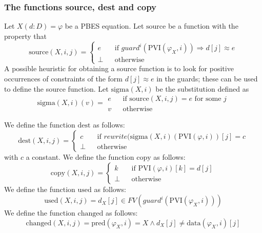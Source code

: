 \subsubsection{The functions source, dest and copy}

Let $X(d:D)=\varphi $ be a PBES equation. Let $\mathrm{source}$ be a
function with the property that 
\begin{equation*}
\mathrm{source}(X,i,j)=\left\{ 
\begin{array}{lll}
e &  & \text{if }guard^{i}(\mathrm{PVI}(\varphi _{X},i))\Rightarrow
d[j]\approx e \\ 
\bot &  & \text{otherwise}%
\end{array}%
\right.
\end{equation*}%
A possible heuristic for obtaining a source function is to look for positive
occurrences of constraints of the form $d[j]\approx e$ in the guards; these
can be used to define the source function. Let $\mathrm{sigma}(X,i)$ be the
substitution defined as%
\begin{equation*}
\mathrm{sigma}(X,i)(v)=%
\begin{array}{lll}
e &  & \text{if }\mathrm{source}(X,i,j)=e\text{ for some }j \\ 
v &  & \text{otherwise}%
\end{array}%
\end{equation*}

We define the function $\mathrm{dest}$ as follows:%
\begin{equation*}
\mathrm{dest}(X,i,j)=\left\{ 
\begin{array}{lll}
c &  & \text{if }rewrite(\mathrm{sigma}(X,i)(\mathrm{PVI}(\varphi ,i))[j]=c
\\ 
\bot &  & \text{otherwise}%
\end{array}%
\right.
\end{equation*}%
with $c$ a constant. We define the function $\mathrm{copy}$ as follows:%
\begin{equation*}
\mathrm{copy}(X,i,j)=\left\{ 
\begin{array}{lll}
k &  & \text{if }\mathrm{PVI}(\varphi ,i)[k]=d[j] \\ 
\bot &  & \text{otherwise}%
\end{array}%
\right.
\end{equation*}%
We define the function $\mathrm{used}$ as follows:%
\begin{equation*}
\mathrm{used}(X,i,j)=d_{X}[j]\in FV(guard^{i}(\mathrm{PVI}(\varphi _{X},i)))
\end{equation*}%
We define the function $\mathrm{changed}$ as follows:%
\begin{equation*}
\mathrm{changed}(X,i,j)=\mathrm{pred}(\varphi _{X},i)=X\wedge d_{X}[j]\neq 
\mathrm{data}(\varphi _{X},i)[j]
\end{equation*}

